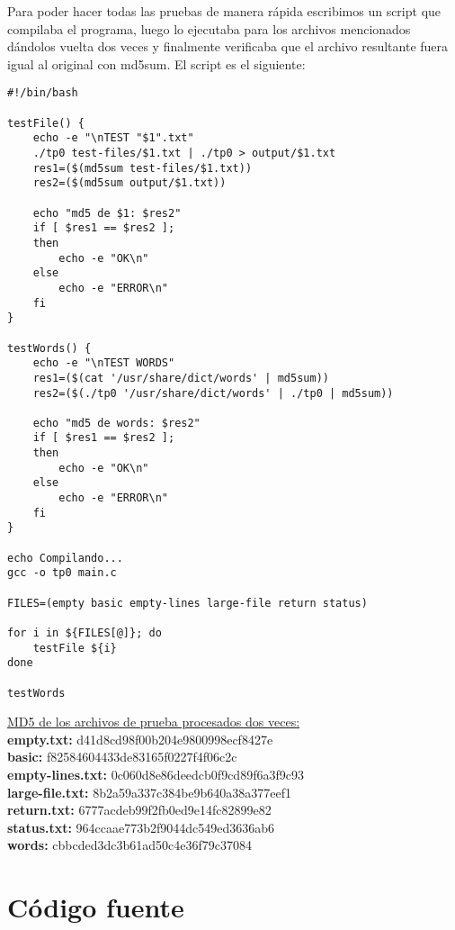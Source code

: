 \documentclass[a4paper,11pt]{article}
\begin{document}
Para poder hacer todas las pruebas de manera r\'apida escribimos un script que compilaba el programa, luego lo ejecutaba para los archivos mencionados d\'andolos vuelta dos veces y finalmente verificaba que el archivo resultante fuera igual al original con md5sum. El script es el siguiente:
\lstset{language=bash, breaklines=true, basicstyle=\normalsize}
\begin{lstlisting}
#!/bin/bash

testFile() {
	echo -e "\nTEST "$1".txt"
	./tp0 test-files/$1.txt | ./tp0 > output/$1.txt
	res1=($(md5sum test-files/$1.txt))
	res2=($(md5sum output/$1.txt))
	
	echo "md5 de $1: $res2"
	if [ $res1 == $res2 ]; 
	then
		echo -e "OK\n"
	else
		echo -e "ERROR\n"
	fi
}

testWords() {
	echo -e "\nTEST WORDS"
	res1=($(cat '/usr/share/dict/words' | md5sum))
	res2=($(./tp0 '/usr/share/dict/words' | ./tp0 | md5sum))
	
	echo "md5 de words: $res2"
	if [ $res1 == $res2 ]; 
	then
		echo -e "OK\n"
	else
		echo -e "ERROR\n"
	fi
}

echo Compilando...
gcc -o tp0 main.c

FILES=(empty basic empty-lines large-file return status)

for i in ${FILES[@]}; do
	testFile ${i}
done

testWords
\end{lstlisting}
\underline{MD5 de los archivos de prueba procesados dos veces:}\\
\textbf{empty.txt:} d41d8cd98f00b204e9800998ecf8427e\\
\textbf{basic:} f82584604433de83165f0227f4f06c2c\\
\textbf{empty-lines.txt:} 0c060d8e86deedcb0f9cd89f6a3f9c93\\
\textbf{large-file.txt:} 8b2a59a337c384be9b640a38a377eef1\\
\textbf{return.txt:} 6777acdeb99f2fb0ed9e14fc82899e82\\
\textbf{status.txt:} 964ccaae773b2f9044dc549ed3636ab6\\
\textbf{words:} cbbcded3dc3b61ad50c4e36f79c37084

\section{C\'odigo fuente}
\end{document}
